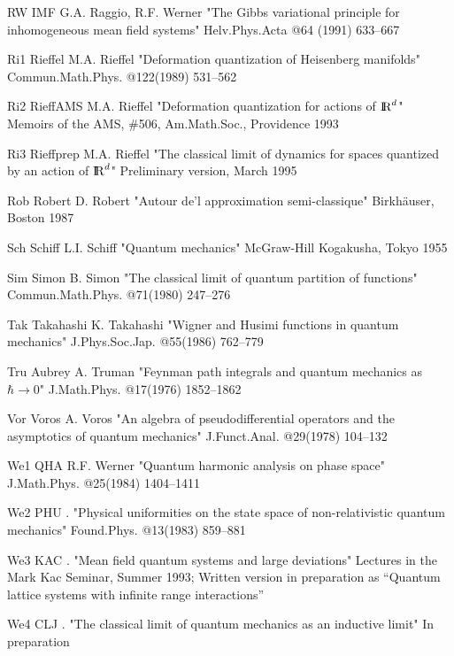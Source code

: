 \REF RW IMF  \Jref
    G.A. Raggio, R.F. Werner
    "The Gibbs variational principle for inhomogeneous mean
        field systems"
    Helv.Phys.Acta @64 (1991) 633--667

\REF Ri1 Rieffel \Jref
    M.A. Rieffel
    "Deformation quantization of Heisenberg manifolds"
    Commun.Math.Phys. @122(1989) 531--562

\REF Ri2 RieffAMS \Bref
    M.A. Rieffel
    "Deformation quantization for actions of $\Rl^d$"
    Memoirs of the AMS, \#506,
    Am.Math.Soc., Providence 1993

\REF Ri3 Rieffprep \Gref
    M.A. Rieffel
    "The classical limit of dynamics for spaces quantized by an
    action of $\Rl^d$"
    Preliminary version, March 1995

\REF Rob Robert \Bref
    D. Robert
    "Autour de'l approximation semi-classique"
    Birkh\"auser, Boston 1987

\REF Sch Schiff \Bref
    L.I. Schiff
    "Quantum mechanics"
    McGraw-Hill Kogakusha, Tokyo 1955

\REF Sim Simon    \Jref
    B. Simon
    "The classical limit of quantum partition of functions"
    Commun.Math.Phys. @71(1980) 247--276

\REF Tak Takahashi \Jref
    K. Takahashi
    "Wigner and Husimi functions in quantum mechanics"
    J.Phys.Soc.Jap. @55(1986) 762--779

\REF Tru Aubrey \Jref
    A. Truman
    "Feynman path integrals and quantum mechanics as $\hbar\to0$"
    J.Math.Phys. @17(1976) 1852--1862

\REF Vor Voros \Jref
    A. Voros
    "An algebra of pseudodifferential operators and the asymptotics of
     quantum mechanics"
    J.Funct.Anal. @29(1978) 104--132

\REF We1 QHA \Jref
    R.F. Werner
    "Quantum harmonic analysis on phase space"
    J.Math.Phys. @25(1984) 1404--1411

\REF We2 PHU \Jref
    \sameauthor. {}
    "Physical uniformities on the state space of
        non-relativistic quantum mechanics"
    Found.Phys. @13(1983) 859--881

\REF We3 KAC \Gref
    \sameauthor. {}
    "Mean field quantum systems and large deviations"
    Lectures in the Mark Kac Seminar, Summer 1993;
    Written version in preparation as ``Quantum lattice systems with
    infinite range interactions''

\REF We4 CLJ \Gref
    \sameauthor. {}
    "The classical limit of quantum mechanics as an inductive limit"
    In preparation

